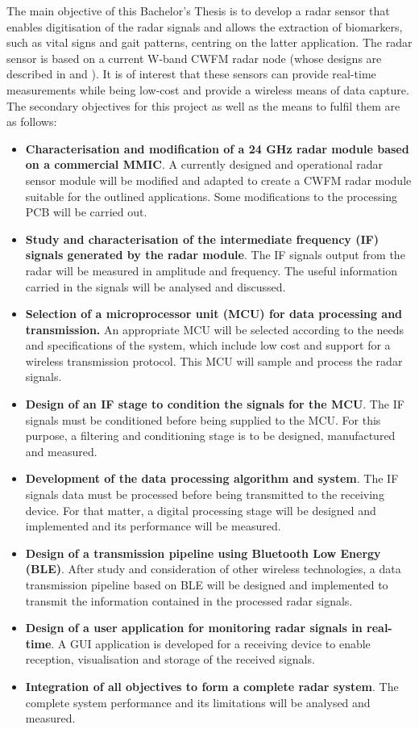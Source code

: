 	The main objective of this Bachelor's Thesis is to develop a radar sensor that enables digitisation of the radar signals and allows the extraction of biomarkers, such as vital signs and gait patterns, centring on the latter application. The radar sensor is based on a current W-band CWFM radar node (whose designs are described in \cite{Sardinero2022} and \cite{Montesano2019}). It is of interest that these sensors can provide real-time measurements while being low-cost and provide a wireless means of data capture. The secondary objectives for this project as well as the means to fulfil them are as follows:
	\begin{itemize}
		\item \textbf{Characterisation and modification of a 24 GHz radar module based on a commercial MMIC}. A currently designed and operational radar sensor module will be modified and adapted to create a CWFM radar module suitable for the outlined applications. Some modifications to the processing PCB will be carried out.
		\item \textbf{Study and characterisation of the intermediate frequency (IF) signals generated by the radar module}. The IF signals output from the radar will be measured in amplitude and frequency. The useful information carried in the signals will be analysed and discussed.
		\item \textbf{Selection of a microprocessor unit (MCU) for data processing and transmission.} An appropriate MCU will be selected according to the needs and specifications of the system, which include low cost and support for a wireless transmission protocol. This MCU will sample and process the radar signals.
		\item \textbf{Design of an IF stage to condition the signals for the MCU}. The IF signals must be conditioned before being supplied to the MCU. For this purpose, a filtering and conditioning stage is to be designed, manufactured and measured.
		\item \textbf{Development of the data processing algorithm and system}. The IF signals data must be processed before being transmitted to the receiving device. For that matter, a digital processing stage will be designed and implemented and its performance will be measured.
		\item \textbf{Design of a transmission pipeline using Bluetooth Low Energy (BLE)}. After study and consideration of other wireless technologies, a data transmission pipeline based on BLE will be designed and implemented to transmit the information contained in the processed radar signals.
		\item \textbf{Design of a user application for monitoring radar signals in real-time}. A GUI application is developed for a receiving device to enable reception, visualisation and storage of the received signals.
		\item \textbf{Integration of all objectives to form a complete radar system}. The complete system performance and its limitations will be analysed and measured.
	\end{itemize}

